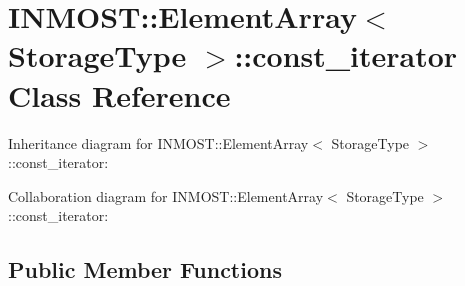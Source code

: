 \hypertarget{classINMOST_1_1ElementArray_1_1const__iterator}{\section{I\-N\-M\-O\-S\-T\-:\-:Element\-Array$<$ Storage\-Type $>$\-:\-:const\-\_\-iterator Class Reference}
\label{classINMOST_1_1ElementArray_1_1const__iterator}
}


Inheritance diagram for I\-N\-M\-O\-S\-T\-:\-:Element\-Array$<$ Storage\-Type $>$\-:\-:const\-\_\-iterator\-:


Collaboration diagram for I\-N\-M\-O\-S\-T\-:\-:Element\-Array$<$ Storage\-Type $>$\-:\-:const\-\_\-iterator\-:
\subsection*{Public Member Functions}
